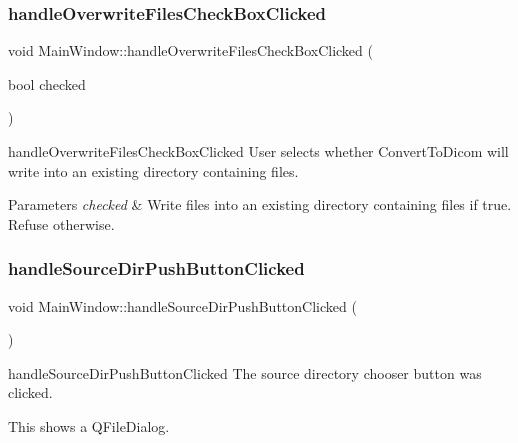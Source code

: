 \subsubsection{\texorpdfstring{handle\+Overwrite\+Files\+Check\+Box\+Clicked}{handleOverwriteFilesCheckBoxClicked}}
{\footnotesize\ttfamily void Main\+Window\+::handle\+Overwrite\+Files\+Check\+Box\+Clicked (\begin{DoxyParamCaption}\item[{bool}]{checked }\end{DoxyParamCaption})\hspace{0.3cm}{\ttfamily [slot]}}



handle\+Overwrite\+Files\+Check\+Box\+Clicked User selects whether Convert\+To\+Dicom will write into an existing directory containing files. 


\begin{DoxyParams}{Parameters}
{\em checked} & Write files into an existing directory containing files if true. Refuse otherwise. \\
\hline
\end{DoxyParams}
\mbox{\label{class_main_window_ac4c08658eff907f63479a31e94c1b76a}} 
\subsubsection{\texorpdfstring{handle\+Source\+Dir\+Push\+Button\+Clicked}{handleSourceDirPushButtonClicked}}
{\footnotesize\ttfamily void Main\+Window\+::handle\+Source\+Dir\+Push\+Button\+Clicked (\begin{DoxyParamCaption}{ }\end{DoxyParamCaption})\hspace{0.3cm}{\ttfamily [slot]}}



handle\+Source\+Dir\+Push\+Button\+Clicked The source directory chooser button was clicked. 

This shows a Q\+File\+Dialog. \mbox{\label{class_main_window_ae3a95084dfba8d357b4dad44a97c0d75}} 

